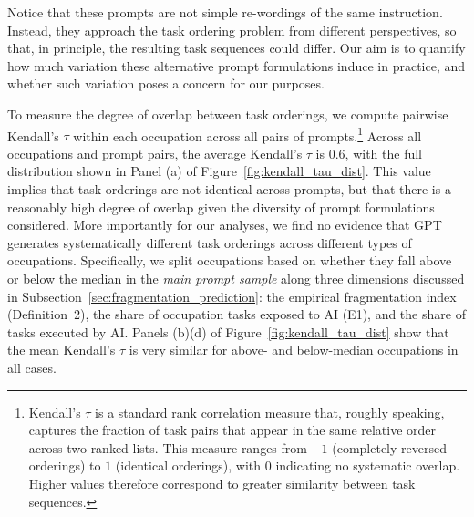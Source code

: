 Notice that these prompts are not simple re-wordings of the same instruction.  
Instead, they approach the task ordering problem from different perspectives, so that, in principle, the resulting task sequences could differ.  
Our aim is to quantify how much variation these alternative prompt formulations induce in practice, and whether such variation poses a concern for our purposes.

To measure the degree of overlap between task orderings, we compute pairwise Kendall's $\tau$ within each occupation across all pairs of prompts.\footnote{
Kendall's $\tau$ is a standard rank correlation measure that, roughly speaking, captures the fraction of task pairs that appear in the same relative order across two ranked lists.
This measure ranges from $-1$ (completely reversed orderings) to $1$ (identical orderings), with $0$ indicating no systematic overlap.  
Higher values therefore correspond to greater similarity between task sequences.
}
Across all occupations and prompt pairs, the average Kendall's $\tau$ is $0.6$, with the full distribution shown in Panel (a) of Figure~\ref{fig:kendall_tau_dist}.
This value implies that task orderings are not identical across prompts, but that there is a reasonably high degree of overlap given the diversity of prompt formulations considered.
More importantly for our analyses, we find no evidence that GPT generates systematically different task orderings across different types of occupations.
Specifically, we split occupations based on whether they fall above or below the median in the \emph{main prompt sample} along three dimensions discussed in Subsection~\ref{sec:fragmentation_prediction}: the empirical fragmentation index (Definition~2), the share of occupation tasks exposed to AI (E1), and the share of tasks executed by AI.
Panels (b)\textendash(d) of Figure~\ref{fig:kendall_tau_dist} show that the mean Kendall's $\tau$ is very similar for above- and below-median occupations in all cases.
